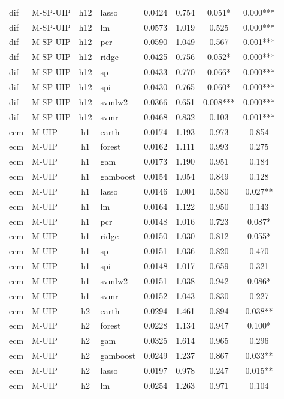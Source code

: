 \begin{ThreePartTable}
\begin{longtable}[t]{llclcccc}
dif & M-SP-UIP & h12 & lasso & 0.0424 & 0.754 & 0.051* & 0.000***\\
dif & M-SP-UIP & h12 & lm & 0.0573 & 1.019 & 0.525 & 0.000***\\
dif & M-SP-UIP & h12 & pcr & 0.0590 & 1.049 & 0.567 & 0.001***\\
dif & M-SP-UIP & h12 & ridge & 0.0425 & 0.756 & 0.052* & 0.000***\\
dif & M-SP-UIP & h12 & sp & 0.0433 & 0.770 & 0.066* & 0.000***\\
dif & M-SP-UIP & h12 & spi & 0.0430 & 0.765 & 0.060* & 0.000***\\
dif & M-SP-UIP & h12 & svmlw2 & 0.0366 & 0.651 & 0.008*** & 0.000***\\
dif & M-SP-UIP & h12 & svmr & 0.0468 & 0.832 & 0.103 & 0.001***\\
\addlinespace
ecm & M-UIP & h1 & earth & 0.0174 & 1.193 & 0.973 & 0.854\\
ecm & M-UIP & h1 & forest & 0.0162 & 1.111 & 0.993 & 0.275\\
ecm & M-UIP & h1 & gam & 0.0173 & 1.190 & 0.951 & 0.184\\
ecm & M-UIP & h1 & gamboost & 0.0154 & 1.054 & 0.849 & 0.128\\
ecm & M-UIP & h1 & lasso & 0.0146 & 1.004 & 0.580 & 0.027**\\
ecm & M-UIP & h1 & lm & 0.0164 & 1.122 & 0.950 & 0.143\\
ecm & M-UIP & h1 & pcr & 0.0148 & 1.016 & 0.723 & 0.087*\\
ecm & M-UIP & h1 & ridge & 0.0150 & 1.030 & 0.812 & 0.055*\\
ecm & M-UIP & h1 & sp & 0.0151 & 1.036 & 0.820 & 0.470\\
ecm & M-UIP & h1 & spi & 0.0148 & 1.017 & 0.659 & 0.321\\
ecm & M-UIP & h1 & svmlw2 & 0.0151 & 1.038 & 0.942 & 0.086*\\
ecm & M-UIP & h1 & svmr & 0.0152 & 1.043 & 0.830 & 0.227\\
\addlinespace
ecm & M-UIP & h2 & earth & 0.0294 & 1.461 & 0.894 & 0.038**\\
ecm & M-UIP & h2 & forest & 0.0228 & 1.134 & 0.947 & 0.100*\\
ecm & M-UIP & h2 & gam & 0.0325 & 1.614 & 0.965 & 0.296\\
ecm & M-UIP & h2 & gamboost & 0.0249 & 1.237 & 0.867 & 0.033**\\
ecm & M-UIP & h2 & lasso & 0.0197 & 0.978 & 0.247 & 0.015**\\
ecm & M-UIP & h2 & lm & 0.0254 & 1.263 & 0.971 & 0.104\\

\end{longtable}
\end{ThreePartTable}
